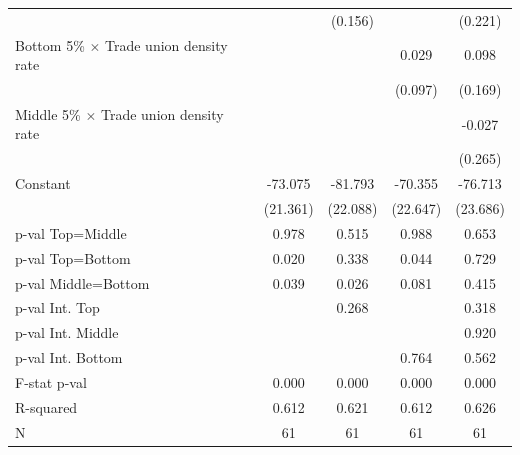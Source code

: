 \begin{tabular}{l*{4}{c}}
                    &            &     (0.156)&            &     (0.221)\\
\addlinespace
Bottom 5\% $\times$ Trade union density rate&            &            &       0.029&       0.098\\
                    &            &            &     (0.097)&     (0.169)\\
\addlinespace
Middle 5\% $\times$ Trade union density rate&            &            &            &      -0.027\\
                    &            &            &            &     (0.265)\\
\addlinespace
Constant            &     -73.075&     -81.793&     -70.355&     -76.713\\
                    &    (21.361)&    (22.088)&    (22.647)&    (23.686)\\
\midrule
p-val Top=Middle    &       0.978&       0.515&       0.988&       0.653\\
p-val Top=Bottom    &       0.020&       0.338&       0.044&       0.729\\
p-val Middle=Bottom &       0.039&       0.026&       0.081&       0.415\\
p-val Int. Top      &            &       0.268&            &       0.318\\
p-val Int. Middle   &            &            &            &       0.920\\
p-val Int. Bottom   &            &            &       0.764&       0.562\\
F-stat p-val        &       0.000&       0.000&       0.000&       0.000\\
R-squared           &       0.612&       0.621&       0.612&       0.626\\
N                   &          61&          61&          61&          61\\
\bottomrule
\end{tabular}
